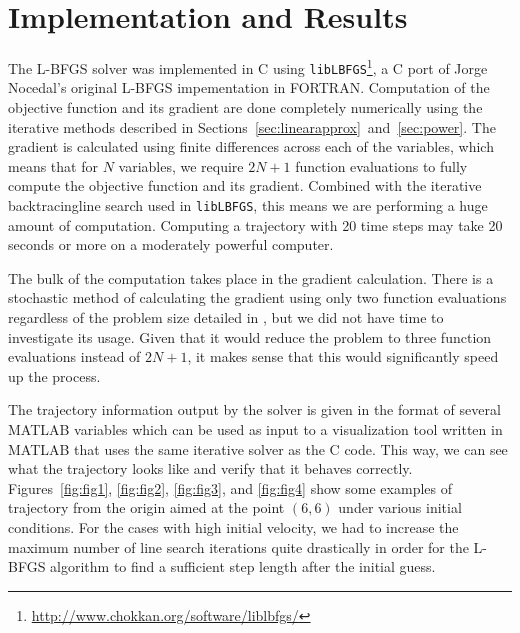 \documentclass{report}
\begin{document}
\section{Implementation and Results}
The L-BFGS solver was implemented in C using
\texttt{libLBFGS}\footnote{\url{http://www.chokkan.org/software/liblbfgs/}}, a C port of 
Jorge Nocedal's original L-BFGS impementation in FORTRAN. Computation of the objective function
and its gradient are done completely numerically using the iterative methods described in 
Sections~\ref{sec:linearapprox}~and~\ref{sec:power}. The gradient is calculated using finite differences
across each of the variables, which means that for $N$ variables, we require $2N+1$ function evaluations
to fully compute the objective function and its gradient. Combined with the iterative backtracingline search used
in \texttt{libLBFGS}, this means we are performing a huge amount of computation. Computing a trajectory with
20 time steps may take 20 seconds or more on a moderately powerful computer.

The bulk of the computation takes place in the gradient calculation. There is a stochastic method of
calculating the gradient using only two function evaluations regardless of the problem size detailed in
\cite{Spall92multivariatestochastic}, but we did not have time to investigate its usage. Given that it would
reduce the problem to three function evaluations instead of $2N+1$, it makes sense that this would significantly 
speed up the process.

The trajectory information output by the solver is given in the format of several MATLAB variables which can be
used as input to a visualization tool written in MATLAB that uses the same iterative solver as the C code.
This way, we can see what the trajectory looks like and verify that it behaves correctly.
Figures~\ref{fig:fig1}, \ref{fig:fig2}, \ref{fig:fig3}, and \ref{fig:fig4} show some examples of trajectory
from the origin aimed at the point $(6, 6)$ under various initial conditions. For the cases with high initial
velocity, we had to increase the maximum number of line search iterations quite drastically in order for the L-BFGS
algorithm to find a sufficient step length after the initial guess.
\end{document}
